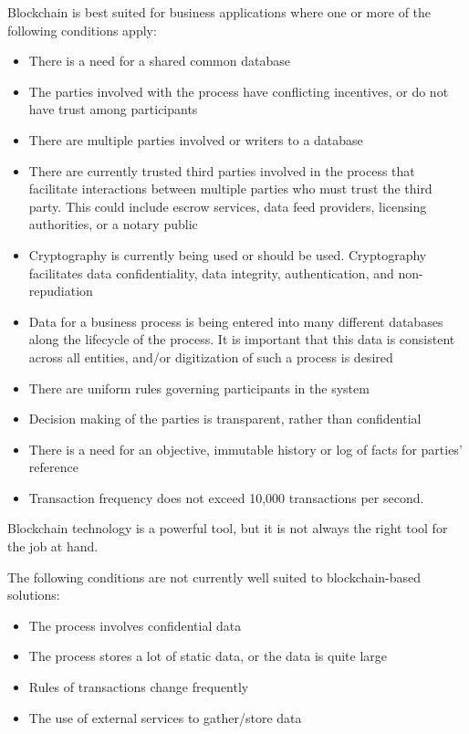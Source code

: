 Blockchain is best suited for business applications where one or more of the following conditions apply:
\begin{itemize}
	\item There is a need for a shared common database
	\item The parties involved with the process have conflicting incentives, or do not have trust among participants
	\item There are multiple parties involved or writers to a database
	\item There are currently trusted third parties involved in the process that facilitate interactions between multiple parties who must trust the third party. This could include escrow services, data feed providers, licensing authorities, or a notary public
	\item Cryptography is currently being used or should be used. Cryptography facilitates data confidentiality, data integrity, authentication, and non-repudiation
	\item Data for a business process is being entered into many different databases along the lifecycle of the process. It is important that this data is consistent across all entities, and/or digitization of such a process is desired
	\item There are uniform rules governing participants in the system
	\item Decision making of the parties is transparent, rather than confidential
	\item There is a need for an objective, immutable history or log of facts for parties’ reference
	\item Transaction frequency does not exceed 10,000 transactions per second.
\end{itemize}

Blockchain technology is a powerful tool, but it is not always the right tool for the job at hand. 

The following conditions are not currently well suited to blockchain-based solutions:
\begin{itemize}
	\item The process involves confidential data
	\item The process stores a lot of static data, or the data is quite large
	\item Rules of transactions change frequently
	\item The use of external services to gather/store data
\end{itemize}

